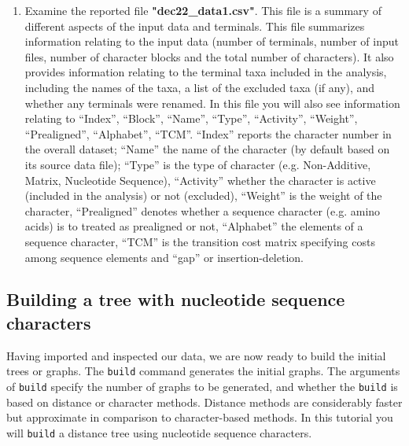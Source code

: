 \documentclass[11pt]{article}
\begin{document}
\begin{enumerate}
\item Examine the reported file \textbf{"dec22\_data1.csv"}. This file is a summary 
of different aspects of the input data and terminals. This file summarizes 
information relating to the input data (number of terminals, number of input files, 
number of character blocks and the total number of characters). It also provides
information relating to the terminal taxa included in the analysis, including the 
names of the taxa, a list of the excluded taxa (if any), and whether any terminals 
were renamed. In this file you will also see information relating to 
``Index'', ``Block'', ``Name'', ``Type'', ``Activity'', ``Weight'', ``Prealigned'', ``Alphabet'', 
``TCM''. ``Index'' reports the character number in the overall dataset; ``Name'' the 
name of the character (by default based on its source data file); ``Type'' is the type 
of character (e.g. Non-Additive, Matrix, Nucleotide Sequence), ``Activity'' whether
the character is active (included in the analysis) or not (excluded), ``Weight'' is the 
weight of the character, ``Prealigned''  denotes whether a sequence character 
(e.g. amino acids) is to treated as prealigned or not, ``Alphabet'' the elements of 
a sequence character, ``TCM'' is the transition cost matrix specifying costs among 
sequence elements and ``gap'' or insertion-deletion.
\end{enumerate}

\subsection{Building a tree with nucleotide sequence characters}
\label{subsec:Building}

Having imported and inspected our data, we are now ready to build the initial trees 
or graphs. The \texttt{build} command generates the initial graphs. The arguments 
of \texttt{build} specify the number of graphs to be generated, and whether the \texttt{build} 
is based on distance or character methods. Distance methods are considerably faster but 
approximate in comparison to character-based methods. In this tutorial you will \texttt{build} a 
distance tree using nucleotide sequence characters. 
\end{document}
